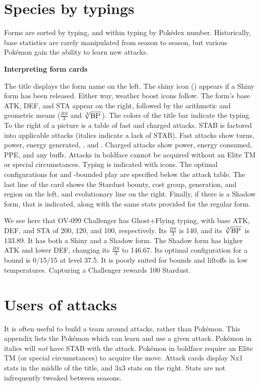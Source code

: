 \chapter{Species by typings\label{chap:speciesbytype}}
Forms are sorted by typing, and within typing by Pokédex number.
Historically, base statistics are rarely manipulated from season to season, but
 various Pokémon gain the ability to learn new attacks.
\vfill
\begin{center}\textbf{Interpreting form cards}\end{center}

The title displays the form name on the left.
The shiny icon () appears
 if a Shiny form has been released.
Either way, weather boost icons follow.
The form's base ATK, DEF, and STA appear on the right, followed by the arithmetic and geometric means
 ($\frac{BS}{3}$ and $\sqrt[3]{\mbox{BP}\,}$).
The colors of the title bar indicate the typing.
To the right of a picture is a table of fast and charged attacks.
STAB is factored into applicable attacks (italics indicate a lack of STAB).
Fast attacks show turns, power, energy generated, \PPT{}, and \EPT{}\@.
Charged attacks show power, energy consumed, PPE, and any buffs.
Attacks in boldface cannot be acquired without an Elite TM or special circumstances.
Typing is indicated with icons.
The optimal configurations for  and -bounded play are specified below the attack table.
The last line of the card shows the Stardust bounty, cost group, generation, and region on the left,
 and evolutionary line on the right.
Finally, if there is a Shadow form, that is indicated, along with the same stats
  provided for the regular form.
\vfill

\bigskip\noindent{}We see here that OV-099 Challenger has Ghost+Flying typing, with base ATK, DEF, and STA
of 200, 120, and 100, respectively. Its $\frac{BS}{3}$ is 140, and its $\sqrt[3]{\mbox{BP}\,}$ is 133.89.
It has both a Shiny and a Shadow form. The Shadow form has higher ATK and lower DEF, changing
its $\frac{BS}{3}$ to 146.67. Its optimal configuration for a  bound is 0/15/15 at level 37.5.
It is poorly suited for  bounds and liftoffs in low temperatures.
Capturing a Challenger rewards 100 Stardust.
\clearpage

\chapter{Users of attacks\label{chap:attackemployers}}
It is often useful to build a team around attacks, rather than Pokémon.
This appendix lists the Pokémon which can learn and use a given attack.
Pokémon in italics will \textit{not} have STAB with the attack.
Pokémon in boldface require an Elite TM (or special circumstances) to acquire the move.
Attack cards display Nx1 stats in the middle of the title, and 3x3 stats on the right.
Stats are not infrequently tweaked between seasons.

